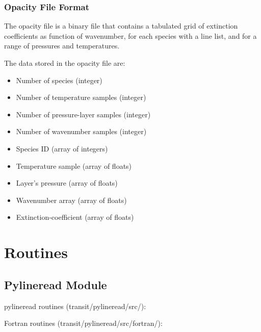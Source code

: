 \documentclass[letterpaper, 12pt]{article}
\begin{document}
\subsubsection{Opacity File Format}

The opacity file is a binary file that contains a tabulated grid of
extinction coefficients as function of wavenumber, for each species
with a line list, and for a range of pressures and temperatures. 

The data stored in the opacity file are:
\begin{itemize}
\setlength\itemsep{0ex}
\setlength\topsep{0ex}
\setlength\partopsep{0ex}
\setlength\parsep{0ex}
\item Number of species (integer)
\item Number of temperature samples (integer)
\item Number of pressure-layer samples (integer)
\item Number of wavenumber samples (integer)
\item Species ID (array of integers)
\item Temperature sample (array of floats)
\item Layer's pressure (array of floats)
\item Wavenumber array (array of floats)
\item Extinction-coefficient (array of floats)
\end{itemize}


\section{Routines}
\label{sec:routines}

\subsection{Pylineread Module}

pylineread routines ({\tttm transit/pylineread/src/}): \\
 \vspace{0.3cm}

Fortran routines ({\tttm transit/pylineread/src/fortran/}): \\
 \vspace{0.3cm}
\end{document}
